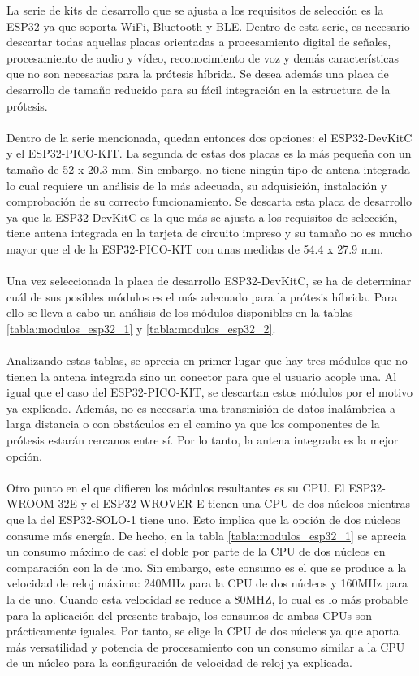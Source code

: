 La serie de kits de desarrollo que se ajusta a los requisitos de selección es la ESP32 ya que soporta WiFi, Bluetooth y BLE. Dentro de esta serie, es necesario descartar todas aquellas placas orientadas a procesamiento digital de señales, procesamiento de audio y vídeo, reconocimiento de voz y demás características que no son necesarias para la prótesis híbrida. Se desea además una placa de desarrollo de tamaño reducido para su fácil integración en la estructura de la prótesis.
\\
\\
Dentro de la serie mencionada, quedan entonces dos opciones: el ESP32-DevKitC y el ESP32-PICO-KIT. La segunda de estas dos placas es la más pequeña con un tamaño de 52 x 20.3 mm\cite{picokit}. Sin embargo, no tiene ningún tipo de antena integrada lo cual requiere un análisis de la más adecuada, su adquisición, instalación y comprobación de su correcto funcionamiento. Se descarta esta placa de desarrollo ya que la ESP32-DevKitC es la que más se ajusta a los requisitos de selección, tiene antena integrada en la tarjeta de circuito impreso y su tamaño no es mucho mayor que el de la ESP32-PICO-KIT con unas medidas de 54.4 x 27.9 mm\cite{devkitc}.
\\
\\
Una vez seleccionada la placa de desarrollo ESP32-DevKitC, se ha de determinar cuál de sus posibles módulos es el más adecuado para la prótesis híbrida. Para ello se lleva a cabo un análisis de los módulos disponibles en la tablas \ref{tabla:modulos_esp32_1} y \ref{tabla:modulos_esp32_2}.
\\
\\
Analizando estas tablas, se aprecia en primer lugar que hay tres módulos que no tienen la antena integrada sino un conector para que el usuario acople una. Al igual que el caso del ESP32-PICO-KIT, se descartan estos módulos por el motivo ya explicado. Además, no es necesaria una transmisión de datos inalámbrica a larga distancia o con obstáculos en el camino ya que los componentes de la prótesis estarán cercanos entre sí. Por lo tanto, la antena integrada es la mejor opción.
\\
\\
Otro punto en el que difieren los módulos resultantes es su CPU. El ESP32-WROOM-32E y el ESP32-WROVER-E tienen una CPU de dos núcleos mientras que la del ESP32-SOLO-1 tiene uno. Esto implica que la opción de dos núcleos consume más energía. De hecho, en la tabla \ref{tabla:modulos_esp32_1} se aprecia un consumo máximo de casi el doble por parte de la CPU de dos núcleos en comparación con la de uno. Sin embargo, este consumo es el que se produce a la velocidad de reloj máxima: 240MHz para la CPU de dos núcleos y 160MHz para la de uno. Cuando esta velocidad se reduce a 80MHZ, lo cual es lo más probable para la aplicación del presente trabajo, los consumos de ambas CPUs son prácticamente iguales\cite{esp32_consumo_cpu}. Por tanto, se elige la CPU de dos núcleos ya que aporta más versatilidad y potencia de procesamiento con un consumo similar a la CPU de un núcleo para la configuración de velocidad de reloj ya explicada.
